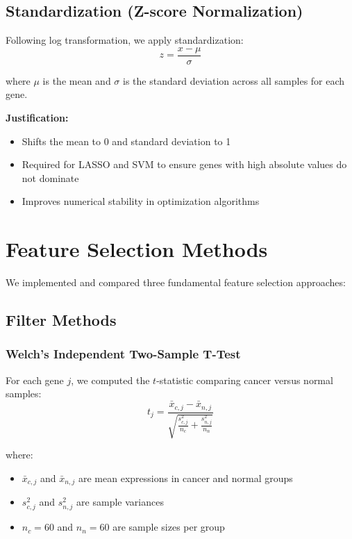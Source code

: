 \subsection{Standardization (Z-score Normalization)}

Following log transformation, we apply standardization:
\begin{equation}
    z = \frac{x - \mu}{\sigma}
\end{equation}

where $\mu$ is the mean and $\sigma$ is the standard deviation across all samples for each gene.

\textbf{Justification:}
\begin{itemize}
    \item Shifts the mean to 0 and standard deviation to 1
    \item Required for LASSO and SVM to ensure genes with high absolute values do not dominate
    \item Improves numerical stability in optimization algorithms
\end{itemize}

\section{Feature Selection Methods}

We implemented and compared three fundamental feature selection approaches:

\subsection{Filter Methods}

\subsubsection{Welch's Independent Two-Sample T-Test}

For each gene $j$, we computed the $t$-statistic comparing cancer versus normal samples:
\begin{equation}
    t_j = \frac{\bar{x}_{c,j} - \bar{x}_{n,j}}{\sqrt{\frac{s_{c,j}^2}{n_c} + \frac{s_{n,j}^2}{n_n}}}
\end{equation}

where:
\begin{itemize}
    \item $\bar{x}_{c,j}$ and $\bar{x}_{n,j}$ are mean expressions in cancer and normal groups
    \item $s_{c,j}^2$ and $s_{n,j}^2$ are sample variances
    \item $n_c = 60$ and $n_n = 60$ are sample sizes per group
\end{itemize}

